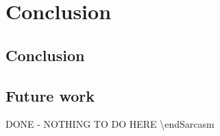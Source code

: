 \chapter{Conclusion}
\section{Conclusion}

\section{Future work}
DONE - NOTHING TO DO HERE \hspace{1cm} \textbackslash endSarcasm
